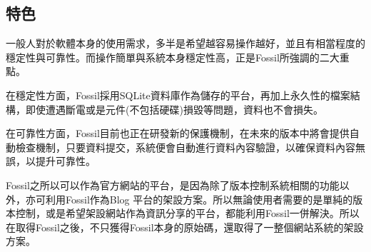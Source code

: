 \subsection{特色}
\par
\renewcommand{\baselinestretch}{1} %
\twelve \qquad 一般人對於軟體本身的使用需求，多半是希望越容易操作越好，並且有相當程度的穩定性與可靠性。而操作簡單與系統本身穩定性高，正是Fossil所強調的二大重點。
\\
\par
\renewcommand{\baselinestretch}{1} %
\twelve \hspace{0.5em} 在穩定性方面，Fossil採用SQLite資料庫作為儲存的平台，再加上永久性的檔案結構，即使遭遇斷電或是元件(不包括硬碟)損毀等問題，資料也不會損失。
\\
\par
\renewcommand{\baselinestretch}{1} %
\twelve \hspace{0.5em} 在可靠性方面，Fossil目前也正在研發新的保護機制，在未來的版本中將會提供自動檢查機制，只要資料提交，系統便會自動進行資料內容驗證，以確保資料內容無誤，以提升可靠性。
\\
\par
\renewcommand{\baselinestretch}{1} %
\twelve \hspace{0.5em} Fossil之所以可以作為官方網站的平台，是因為除了版本控制系統相關的功能以外，亦可利用Fossil作為Blog 平台的架設方案。所以無論使用者需要的是單純的版本控制，或是希望架設網站作為資訊分享的平台，都能利用Fossil一併解決。所以在取得Fossil之後，不只獲得Fossil本身的原始碼，還取得了一整個網站系統的架設方案。
\par

\renewcommand{\baselinestretch}{20} %
